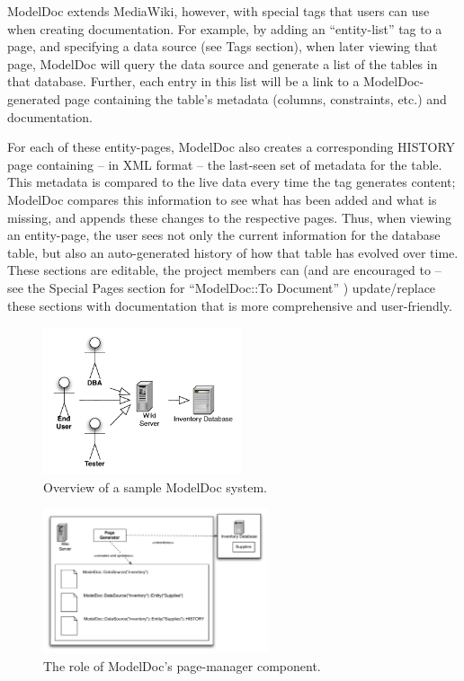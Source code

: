 \documentclass{acm_proc_article-sp}
\begin{document}
ModelDoc extends MediaWiki, however, with special tags that users can use when
creating documentation.  For example, by adding an ``entity-list'' tag to a
page, and specifying a data source (see Tags section), when later viewing that
page, ModelDoc will query the data source and generate a list of the tables in
that database.  Further, each entry in this list will be a link to a
ModelDoc-generated page containing the table's metadata (columns,
constraints, etc.) and documentation.

For each of these entity-pages, ModelDoc also creates a corresponding HISTORY
page containing -- in XML format -- the last-seen set of metadata for the
table.  This metadata is compared to the live data every time the tag generates
content; ModelDoc compares this information to see what has been added and what
is missing, and appends these changes to the respective pages.  Thus, when
viewing an entity-page, the user sees not only the current information for the
database table, but also an auto-generated history of how that table has
evolved over time.  These sections are editable, the project members can (and
are encouraged to -- see the Special Pages section for ``ModelDoc::To Document''
) update/replace these sections with documentation that is more comprehensive
and user-friendly.

\begin{figure}[b]
\centering
\includegraphics[width=220px]{Overview.pdf}
\caption{Overview of a sample ModelDoc system.}
\end{figure}

\begin{figure}
\centering
\includegraphics[width=250px]{PageManager.pdf}
\caption{The role of ModelDoc's page-manager component.}
\end{figure}
\end{document}

